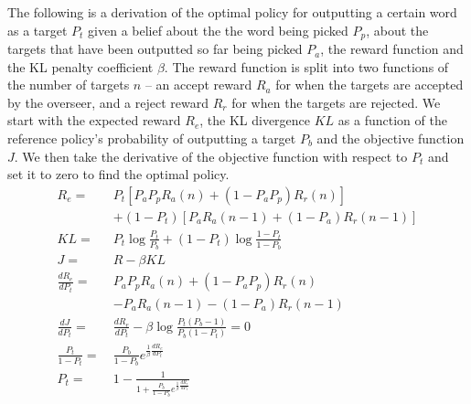 \documentclass{article}
\begin{document}
The following is a derivation of the optimal policy for outputting a certain word as a target $P_t$ given a belief about the the word being picked $P_p$, about the targets that have been outputted so far being picked $P_a$, the reward function and the KL penalty coefficient $\beta$. The reward function is split into two functions of the number of targets $n$ -- an accept reward $R_a$ for when the targets are accepted by the overseer, and a reject reward $R_r$ for when the targets are rejected. We start with the expected reward $R_e$, the KL divergence $KL$ as a function of the reference policy's probability of outputting a target $P_b$ and the objective function $J$. We then take the derivative of the objective function with respect to $P_t$ and set it to zero to find the optimal policy.
\begin{align*}
  R_e = \:                 & P_t \left[P_aP_pR_a(n)+(1-P_aP_p)R_r(n) \right]                            \\
                           & + (1 - P_t) \left[P_aR_a(n-1)+(1-P_a)R_r(n-1) \right]                      \\
  KL = \:                  & P_t\log \frac{P_t}{P_b} + (1-P_t) \log \frac{1-P_t}{1-P_b}                 \\
  J = \:                   & R - \beta KL                                                               \\
  \frac{dR_e}{dP_t} = \:   & P_aP_pR_a(n) + (1-P_aP_p)R_r(n)                                            \\
                           & - P_aR_a(n-1) - (1-P_a)R_r(n-1)                                            \\
  \frac{dJ}{dP_t} = \:     & \frac{dR_e}{dP_t} - \beta \log \frac{P_t (P_b - 1)}{P_b (1-P_t)} = 0       \\
  \frac{P_t}{1 - P_t} = \: & \frac{P_b}{1 - P_b} e^{\frac{1}{\beta}\frac{dR_e}{dP_t}}                   \\
  P_t = \:                 & 1 - \frac{1}{1 + \frac{P_b}{1 - P_b} e^{\frac{1}{\beta}\frac{dR_e}{dP_t}}}
\end{align*}
\end{document}
